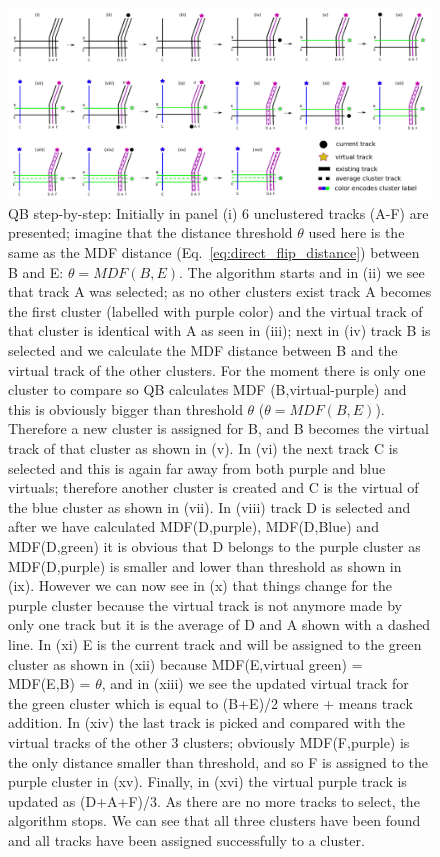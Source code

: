 \documentclass[preprint,authoryear,a4paper,10pt,onecolumn]{elsarticle}
\begin{document}
\begin{figure}
\includegraphics[scale=0.25]{Fig_1_QB_algorithm}
\caption{QB step-by-step: Initially in panel (i) 6 unclustered tracks
  (A-F) are presented; imagine that the distance threshold $\theta$ used here is
  the same as the MDF distance (Eq.~\ref{eq:direct_flip_distance}) between B and
  E: $\theta = MDF(B,E)$. The algorithm starts and in (ii) we see that track A
  was selected; as no other clusters exist track A becomes the first cluster
  (labelled with purple color) and the virtual track of that cluster is
  identical with A as seen in (iii); next in (iv) track B is selected and we
  calculate the MDF distance between B and the virtual track of the other
  clusters. For the moment there is only one cluster to compare so QB calculates
  MDF (B,virtual-purple) and this is obviously bigger than threshold $\theta$
  ($\theta = MDF(B,E)$).  Therefore a new cluster is assigned for B, and B
  becomes the virtual track of that cluster as shown in (v). In (vi) the next
  track C is selected and this is again far away from both purple and blue
  virtuals; therefore another cluster is created and C is the virtual of the
  blue cluster as shown in (vii).  In (viii) track D is selected and after we
  have calculated MDF(D,purple), MDF(D,Blue) and MDF(D,green) it is obvious that
  D belongs to the purple cluster as MDF(D,purple) is smaller and lower than
  threshold as shown in (ix).  However we can now see in (x) that things change
  for the purple cluster because the virtual track is not anymore made by only
  one track but it is the average of D and A shown with a dashed line. In (xi) E
  is the current track and will be assigned to the green cluster as shown in
  (xii) because MDF(E,virtual green) = MDF(E,B) = $\theta$, and in (xiii) we see
  the updated virtual track for the green cluster which is equal to (B+E)/2
  where + means track addition. In (xiv) the last track is picked and compared
  with the virtual tracks of the other 3 clusters; obviously MDF(F,purple) is
  the only distance smaller than threshold, and so F is assigned to the purple
  cluster in (xv).  Finally, in (xvi) the virtual purple track is updated as
  (D+A+F)/3. As there are no more tracks to select, the algorithm stops. We can
  see that all three clusters have been found and all tracks have been assigned
  successfully to a cluster.
  \label{Fig:LSC_simple}}
\end{figure}
\end{document}
